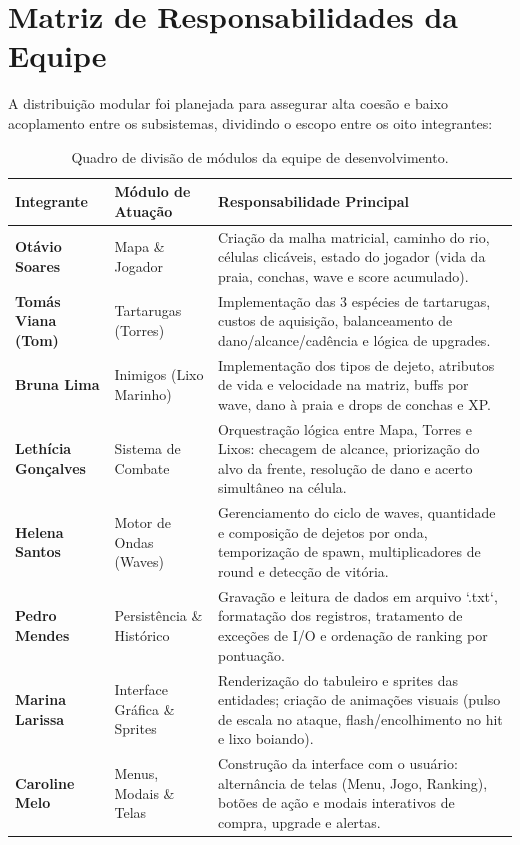 \documentclass[11pt,a4paper]{article}
\begin{document}
\section{Matriz de Responsabilidades da Equipe}

A distribuição modular foi planejada para assegurar alta coesão e baixo acoplamento entre os subsistemas, dividindo o escopo entre os oito integrantes:

\begin{table}[h!]
\centering
\small
\begin{tabularx}{\textwidth}{|p{}|p{}|X|}
\hline
\rowcolor{gray!15}
\textbf{Integrante} & \textbf{Módulo de Atuação} & \textbf{Responsabilidade Principal} \\
\hline
\textbf{Otávio Soares} & Mapa \& Jogador & Criação da malha matricial, caminho do rio, células clicáveis, estado do jogador (vida da praia, conchas, wave e score acumulado). \\
\hline
\textbf{Tomás Viana (Tom)} & Tartarugas (Torres) & Implementação das 3 espécies de tartarugas, custos de aquisição, balanceamento de dano/alcance/cadência e lógica de upgrades. \\
\hline
\textbf{Bruna Lima} & Inimigos (Lixo Marinho) & Implementação dos tipos de dejeto, atributos de vida e velocidade na matriz, buffs por wave, dano à praia e drops de conchas e XP. \\
\hline
\textbf{Lethícia Gonçalves} & Sistema de Combate & Orquestração lógica entre Mapa, Torres e Lixos: checagem de alcance, priorização do alvo da frente, resolução de dano e acerto simultâneo na célula. \\
\hline
\textbf{Helena Santos} & Motor de Ondas (Waves) & Gerenciamento do ciclo de waves, quantidade e composição de dejetos por onda, temporização de spawn, multiplicadores de round e detecção de vitória. \\
\hline
\textbf{Pedro Mendes} & Persistência \& Histórico & Gravação e leitura de dados em arquivo `.txt`, formatação dos registros, tratamento de exceções de I/O e ordenação de ranking por pontuação. \\
\hline
\textbf{Marina Larissa} & Interface Gráfica \& Sprites & Renderização do tabuleiro e sprites das entidades; criação de animações visuais (pulso de escala no ataque, flash/encolhimento no hit e lixo boiando). \\
\hline
\textbf{Caroline Melo} & Menus, Modais \& Telas & Construção da interface com o usuário: alternância de telas (Menu, Jogo, Ranking), botões de ação e modais interativos de compra, upgrade e alertas. \\
\hline
\end{tabularx}
\caption{Quadro de divisão de módulos da equipe de desenvolvimento.}
\label{tab:divisao}
\end{table}
\end{document}
